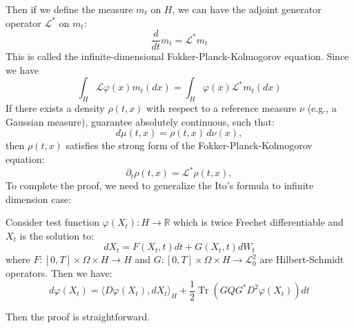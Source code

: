 Then if we define the measure $m_t$ on $H$, we can have the adjoint generator operator $\mathcal{L}^*$ on $m_t$:
\begin{equation}
    \frac{d}{dt} m_t = \mathcal{L}^* m_t
\end{equation}
This is called the infinite-dimensional Fokker-Planck-Kolmogorov equation. Since we have \begin{equation}
    \int_H \mathcal{L}\varphi(x) m_t(dx) = \int_H \varphi(x) \mathcal{L}^* m_t(dx)
\end{equation}
If there exists a density \( \rho(t,x) \) with respect to a reference measure \( \nu \) (e.g., a Gaussian measure), guarantee absolutely continuous, such that:
\begin{equation}
d\mu(t,x) = \rho(t,x) \, d\nu(x),
\end{equation}
then \( \rho(t,x) \) satisfies the strong form of the Fokker-Planck-Kolmogorov equation:
\begin{equation}
\partial_t \rho(t,x) = \mathcal{L}^* \rho(t,x),
\end{equation}
To complete the proof, we need to generalize the Ito's formula to infinite dimension case:
\begin{theorem}
    Consider test function $\varphi(X_t): H\rightarrow \mathbb{R}$ which is twice Frechet differentiable and $X_t$ is the solution to:
    \begin{equation}
        dX_t = F(X_t, t)dt + G(X_t, t)dW_t
    \end{equation}
    where $F: [0, T] \times \Omega \times H \rightarrow H$ and $G: [0, T] \times \Omega \times H \rightarrow \mathcal{L}_0^2$ are Hilbert-Schmidt operators. Then we have: 
    \begin{equation}
        d\varphi(X_t) = \langle D\varphi(X_t), dX_t\rangle_H + \frac{1}{2}\operatorname{Tr}\left(GQG^*D^2\varphi(X_t)\right)dt
    \end{equation}
\end{theorem}
Then the proof is straightforward.

